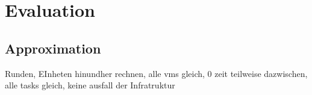 \chapter{Evaluation}
\label{ch:Evaluation}


\section{Approximation}
Runden, EInheten hinundher rechnen, alle vms gleich, 0 zeit teilweise dazwischen, alle tasks gleich, keine ausfall der Infratruktur